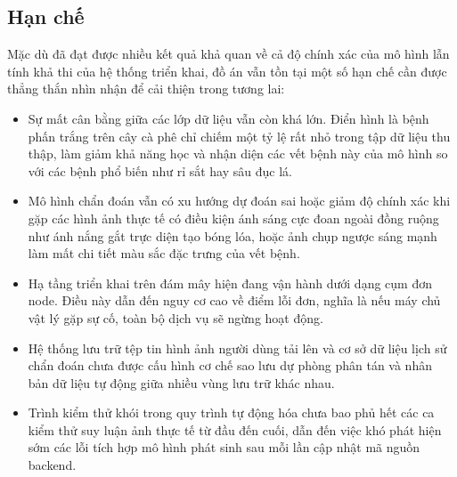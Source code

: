 \subsection{Hạn chế}
Mặc dù đã đạt được nhiều kết quả khả quan về cả độ chính xác của mô hình lẫn tính khả thi của hệ thống triển khai, đồ án vẫn tồn tại một số hạn chế cần được thẳng thắn nhìn nhận để cải thiện trong tương lai:
\begin{itemize}
  \item Sự mất cân bằng giữa các lớp dữ liệu vẫn còn khá lớn. Điển hình là bệnh phấn trắng trên cây cà phê chỉ chiếm một tỷ lệ rất nhỏ trong tập dữ liệu thu thập, làm giảm khả năng học và nhận diện các vết bệnh này của mô hình so với các bệnh phổ biến như rỉ sắt hay sâu đục lá.
  \item Mô hình chẩn đoán vẫn có xu hướng dự đoán sai hoặc giảm độ chính xác khi gặp các hình ảnh thực tế có điều kiện ánh sáng cực đoan ngoài đồng ruộng như ánh nắng gắt trực diện tạo bóng lóa, hoặc ảnh chụp ngược sáng mạnh làm mất chi tiết màu sắc đặc trưng của vết bệnh.
  \item Hạ tầng triển khai trên đám mây hiện đang vận hành dưới dạng cụm đơn node. Điều này dẫn đến nguy cơ cao về điểm lỗi đơn, nghĩa là nếu máy chủ vật lý gặp sự cố, toàn bộ dịch vụ sẽ ngừng hoạt động.
  \item Hệ thống lưu trữ tệp tin hình ảnh người dùng tải lên và cơ sở dữ liệu lịch sử chẩn đoán chưa được cấu hình cơ chế sao lưu dự phòng phân tán và nhân bản dữ liệu tự động giữa nhiều vùng lưu trữ khác nhau.
  \item Trình kiểm thử khói trong quy trình tự động hóa chưa bao phủ hết các ca kiểm thử suy luận ảnh thực tế từ đầu đến cuối, dẫn đến việc khó phát hiện sớm các lỗi tích hợp mô hình phát sinh sau mỗi lần cập nhật mã nguồn backend.
\end{itemize}

